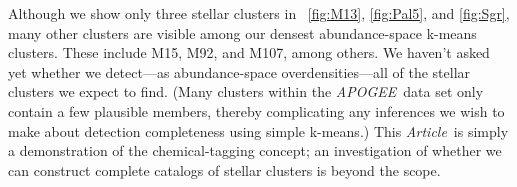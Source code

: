\documentclass[12pt, letterpaper, preprint]{aastex}
\newcommand{\acronym}[1]{{\small{#1}}}
\newcommand{\project}[1]{\textsl{#1}}
\newcommand{\apogee}{\project{\acronym{APOGEE}}}
\newcommand{\documentname}{\textsl{Article}}
\begin{document}
Although we show only three stellar clusters in
\figurename~\ref{fig:M13}, \ref{fig:Pal5}, and \ref{fig:Sgr}, many
other clusters are visible among our densest abundance-space k-means
clusters.
These include M15, M92, and M107, among others.
We haven't asked yet whether we detect---as abundance-space
overdensities---all of the stellar clusters we expect to find. (Many
clusters within the \apogee\ data set only contain a few plausible 
members, thereby  complicating any inferences we wish to make about 
detection completeness using simple k-means.) 
This \documentname\ is simply a demonstration of the chemical-tagging
concept; an investigation of whether we can construct complete
catalogs of stellar clusters is beyond the scope.


\end{document}
